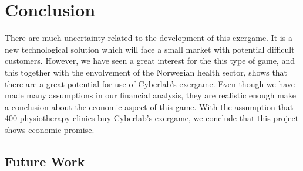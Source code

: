 \chapter{Conclusion}
There are much uncertainty related to the development of this exergame. It is a new technological solution which will face a small market with potential difficult customers. However, we have seen a great interest for the this type of game, and this together with the envolvement of the Norwegian health sector, shows that there are a great potential for use of Cyberlab’s exergame. Even though we have made many assumptions in our financial analysis, they are realistic enough make a conclusion about the economic aspect of this game. With the assumption that 400 physiotherapy clinics buy Cyberlab’s exergame, we conclude that this project shows economic promise.  
\section{Future Work}
